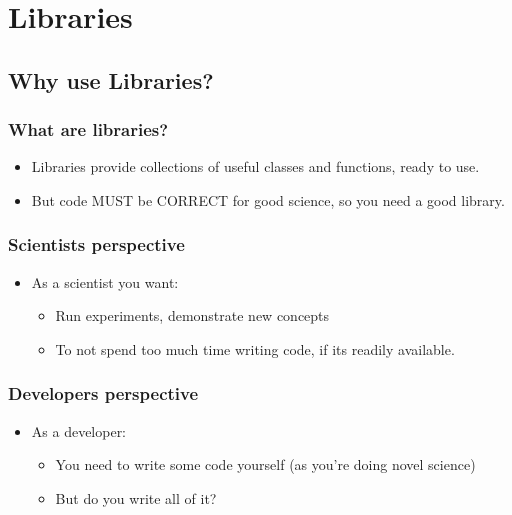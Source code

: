 \section{Libraries}\label{libraries}

\subsection{Why use Libraries?}\label{why-use-libraries}

\subsubsection{What are libraries?}\label{what-are-libraries}

\begin{itemize}
\itemsep1pt\parskip0pt
\item
  Libraries provide collections of useful classes and functions, ready
  to use.
\item
  But code MUST be CORRECT for good science, so you need a good library.
\end{itemize}

\subsubsection{Scientists perspective}\label{scientists-perspective}

\begin{itemize}
\itemsep1pt\parskip0pt
\item
  As a scientist you want:

  \begin{itemize}
  \itemsep1pt\parskip0pt
  \item
    Run experiments, demonstrate new concepts
  \item
    To not spend too much time writing code, if its readily available.
  \end{itemize}
\end{itemize}

\subsubsection{Developers perspective}\label{developers-perspective}

\begin{itemize}
\itemsep1pt\parskip0pt
\item
  As a developer:

  \begin{itemize}
  \itemsep1pt\parskip0pt
  \item
    You need to write some code yourself (as you're doing novel science)
  \item
    But do you write all of it?
  \end{itemize}
\end{itemize}

